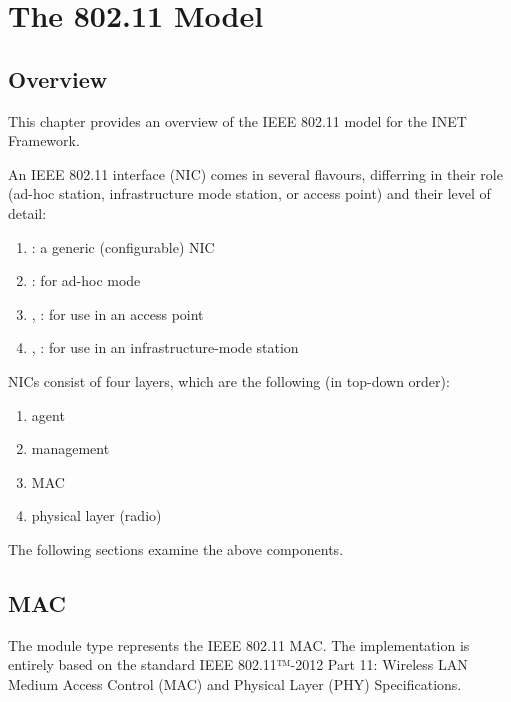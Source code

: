 \chapter{The 802.11 Model}
\label{cha:80211}


\section{Overview}

This chapter provides an overview of the IEEE 802.11 model for the INET Framework.

An IEEE 802.11 interface (NIC) comes in several flavours, differring
in their role (ad-hoc station, infrastructure mode station, or
access point) and their level of detail:

\begin{enumerate}
 \item {}: a generic (configurable) NIC
 \item {}: for ad-hoc mode
 \item {}, : for use in an access point
 \item {}, : for use in an
   infrastructure-mode station
\end{enumerate}

NICs consist of four layers, which are the following (in top-down order):

\begin{enumerate}
  \item agent
  \item management
  \item MAC
  \item physical layer (radio)
\end{enumerate}

The following sections examine the above components.

\section{MAC}

The  module type represents the IEEE 802.11 MAC.
The implementation is entirely based on the standard IEEE 802.11™-2012 Part 11:
Wireless LAN Medium Access Control (MAC) and Physical Layer (PHY)
Specifications.

